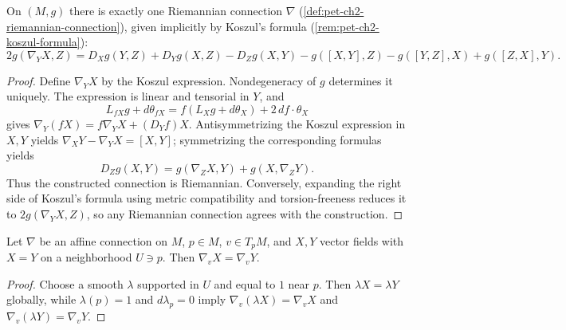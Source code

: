 \begin{theorem}
  \label{thm:pet-ch2-fundamental-theorem}


  On $(M,g)$ there is exactly one Riemannian connection $\nabla$
  (\cref{def:pet-ch2-riemannian-connection}), given implicitly by Koszul's
  formula (\cref{rem:pet-ch2-koszul-formula}):
  \[
    2g(\nabla_YX,Z)=D_Xg(Y,Z)+D_Yg(X,Z)-D_Zg(X,Y)
    -g([X,Y],Z)-g([Y,Z],X)+g([Z,X],Y).
  \]
\end{theorem}
\begin{proof}

  \sketch
  Define $\nabla_YX$ by the Koszul
  expression. Nondegeneracy of $g$ determines it uniquely. The expression is
  linear and tensorial in $Y$, and
  \[
    L_{fX}g+d\theta_{fX}
      =f(L_Xg+d\theta_X)+2\,df\cdot\theta_X
  \]
  gives $\nabla_Y(fX)=f\nabla_YX+(D_Yf)X$. Antisymmetrizing the Koszul
  expression in $X,Y$ yields
  $\nabla_XY-\nabla_YX=[X,Y]$; symmetrizing the corresponding formulas yields
  \[
    D_Zg(X,Y)=g(\nabla_ZX,Y)+g(X,\nabla_ZY).
  \]
  Thus the constructed connection is Riemannian. Conversely, expanding the
  right side of Koszul's formula using metric compatibility and
  torsion-freeness reduces it to $2g(\nabla_YX,Z)$, so any Riemannian
  connection agrees with the construction.
\end{proof}

\begin{lemma}
  \label{lem:pet-ch2-locality-open-set}


  Let $\nabla$ be an affine connection on $M$, $p\in M$, $v\in T_pM$, and
  $X,Y$ vector fields with $X=Y$ on a neighborhood $U\ni p$. Then
  $\nabla_vX=\nabla_vY$.
\end{lemma}
\begin{proof}

  \sketch
  Choose a smooth $\lambda$ supported in
  $U$ and equal to $1$ near $p$. Then $\lambda X=\lambda Y$ globally, while
  $\lambda(p)=1$ and $d\lambda_p=0$ imply
  $\nabla_v(\lambda X)=\nabla_vX$ and
  $\nabla_v(\lambda Y)=\nabla_vY$.
\end{proof}

